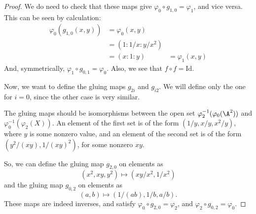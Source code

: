 \documentclass[12pt]{article}
\theoremstyle{definition}
\newenvironment{problem}[2][Problem]{\begin{trivlist}
\item[\hskip \labelsep {\bfseries #1}\hskip \labelsep {\bfseries #2.}]}{\end{trivlist}}
\begin{document}
\begin{problem}{3}
\begin{proof}
				 \par We do need to check that these maps give $\varphi_0 \circ g_{1,0} = \varphi_1 $, and vice versa. This can be seen by calculation:
				 \begin{align*}
					 \varphi_0(g_{1,0}(x,y)) &= \varphi_0(x,y)\\
					 &= (1:1/x:y/x^2)\\
					 &= (x: 1 : y)
					 &= \varphi_1(x,y)
				 \end{align*}
				 And, symmetrically, $\varphi_1 \circ g_{0,1} = \varphi_0$. Also, we see that $f \circ f = \text{Id}$.
				 \par Now, we want to define the gluing maps $g_{2i}$ and $g_{i2}$. We will define only the one for $i=0$, since the other case is very similar.
				 \par The gluing maps should be isomorphisms between the open set $\varphi_{2}^{-1}(\varphi_0(\A^2))$ and $\varphi_0^{-1}(\varphi_2(X))$. An element of the first set is of the form $(1/y, x/y, x^2/y)$, where $y$ is some nonzero value, and an element of the second set is of the form $(y^2 / (xy), 1/ (xy)^2)$, for some nonzero $xy$. 
				 \par So, we can define the gluing map $g_{2,0}$ on elements as
				 \[(x^2, xy, y^2) \mapsto ( xy/x^2,1/x^2 ) \]
				 and the gluing map $g_{0,2}$ on elements as
				 \[(a,b) \mapsto ( 1/(ab), 1/b,a/b).\]
				 These maps are indeed inverses, and satisfy $\varphi_0 \circ g_{2,0} = \varphi_2$, and $\varphi_2 \circ g_{0,2} = \varphi_0$. 
	 \end{proof}
\end{problem}
\end{document}
